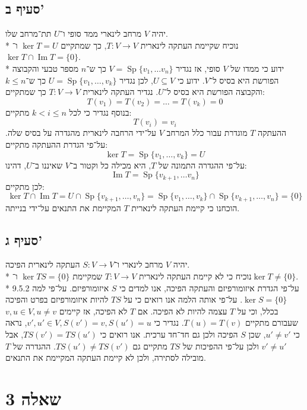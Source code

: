\documentclass[a4paper,10pt]{article}
\DeclareMathOperator\Sp{Sp}
\DeclareMathOperator\im{Im}
\begin{document}
\begin{hebrew}
	\subsection{סעיף ב'}
	יהיה $V$ מרחב לינארי ממד סופי ו־$U$ תת־מרחב שלו. \\*
	נוכיח שקיימת העתקה לינארית $T: V \to V$,
	כך שמתקיים $\ker T = U$ ו־$\ker T \cap \im T = \{0\}$. \\*
	ידוע כי ממדו של $V$ סופי, אז נגדיר $V = \Sp\{ v_1, \hdots v_n \}$
	כך ש־$n$ מספר טבעי והקבוצה הפורשת היא בסיס ל־$V$. ידוע כי $U \subseteq V$,
	לכן נגדיר $U = \Sp\{v_1,\hdots, v_k\}$ כך ש־$k \le n$
	והקבוצה הפורשת היא בסיס ל־$U$.
	נגדיר העתקה לינארית $T: V \to V$ כך שמתקיים:
	\[
		T(v_1) = T(v_2) = \hdots = T(v_k) = 0
	\]
	בנוסף נגדיר כי לכל $k < i \le n$ מתקיים:
	\[
		T(v_i) = v_i
	\]
	ההעתקה $T$ מוגדרת עבור כלל המרחב $V$ על־ידי הרחבה לינארית מהגדרה
	על בסיס שלה. על־פי הגדרת ההעתקה מתקיים:
	\[
		\ker T = \Sp\{v_1, \hdots, v_k\} = U
	\]
	על־פי ההגדרה התמונה של $T$, היא מכילה כל וקטור ב־$V$ שאיננו ב־$U$, דהינו:
	\[
		\im T = \Sp\{v_{k + 1}, \hdots v_n\}
	\]
	לכן מתקיים:
	\[
		\ker T \cap \im T
		= U \cap \Sp\{v_{k + 1}, \hdots, v_n\}
		= \Sp\{v_1,\hdots, v_k\} \cap \Sp\{v_{k + 1}, \hdots, v_n\}
		= \{0\}
	\]
	הוכחנו כי קיימת העתקה לינארית $T$ המקיימת את התנאים על־ידי בנייתה.

	\subsection{סעיף ג'}
	יהיה $V$ מרחב לינארי ו־$S: V \to V$ העתקה לינארית הפיכה. \\*
	נוכיח כי לא קיימת העתקה לינארית $T: V \to V$ שמקיימת
	$\ker TS = \{0\}$ ו־$\ker T \ne \{0\}$. \\*
	על־פי הגדרת איזומורפיזם והעתקה הפיכה, אנו למדים כי $S$ איזומורפיזם.
	על־פי למה 9.5.2 $\ker S = \{0\}$.
	על־פי אותה הלמה אנו רואים כי על $TS$ להיות איזומורפיזם בפרט והפיכה בכלל,
	וכי על $T$ עצמה להיות לא הפיכה.
	אם $T$ לא הפיכה, אז קיימים $v, u \in V, u \ne v$
	שעבורם מתקיים $T(u) = T(v)$.
	נגדיר כי $v', u' \in V, S(v') = v, S(u') = u$,
	נראה כי $u' \ne v'$, שכן $S$ הפיכה ולכן גם חד־חד ערכית.
	אנו רואים כי $TS(v') = TS(u')$, אבל $v' \ne u'$ ולכן על־פי
	ההפיכות של $TS$ מתקיים גם $TS(u') \ne TS(v')$.
	ההגדרה של $T$ מובילה לסתירה, ולכן לא קיימת העתקה המקיימת את התנאים.

	\section{שאלה 3}

\end{hebrew}
\end{document}
